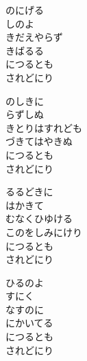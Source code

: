 \documentclass[10pt,b5j]{tarticle} %
\begin{document}
\vspace{1.5em} %
\newcommand{\linespace}{0.5em} %
\newcommand{\blocksize}{0.5\hsize} %
\begin{enumerate} %
    \begin{minipage}[c]{\blocksize}
    
        \vspace{\linespace}
        \item
        のにげる\\
        しのよ\\
        きだえやらず\\
        きばるる\\
        につるとも\\
        されどにり
        
        \vspace{\linespace}
        \item
        のしきに\\
        らずしぬ\\
        きとりはすれども\\
        づきてはやきぬ\\
        につるとも\\
        されどにり
        
        \vspace{\linespace}
        \item
        るるどきに\\
        はかきて\\
        むなくひゆける\\
        このをしみにけり\\
        につるとも\\
        されどにり
        
        \vspace{\linespace}
        \item
        ひるのよ\\
        すにく\\
        なすのに\\
        にかいてる\\
        につるとも\\
        されどにり
        

\end{minipage}
\end{enumerate}
\end{document}
